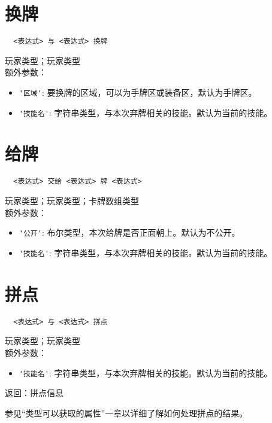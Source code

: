 \section{换牌}

\begin{verbatim}
  <表达式> 与 <表达式> 换牌
\end{verbatim}

玩家类型；玩家类型 \\

额外参数：

\begin{itemize}
  \item \verb|'区域'|: 要换牌的区域，可以为手牌区或装备区，默认为手牌区。
  \item \verb|'技能名'|: 字符串类型，与本次弃牌相关的技能。默认为当前的技能。
\end{itemize}

\section{给牌}

\begin{verbatim}
  <表达式> 交给 <表达式> 牌 <表达式>
\end{verbatim}

玩家类型；玩家类型；卡牌数组类型 \\

额外参数：

\begin{itemize}
  \item \verb|'公开'|: 布尔类型，本次给牌是否正面朝上。默认为不公开。
  \item \verb|'技能名'|: 字符串类型，与本次弃牌相关的技能。默认为当前的技能。
\end{itemize}

\section{拼点}

\begin{verbatim}
  <表达式> 与 <表达式> 拼点
\end{verbatim}

玩家类型；玩家类型 \\

额外参数：

\begin{itemize}
  \item \verb|'技能名'|: 字符串类型，与本次弃牌相关的技能。默认为当前的技能。
\end{itemize}

返回：拼点信息

参见“类型可以获取的属性”一章以详细了解如何处理拼点的结果。

